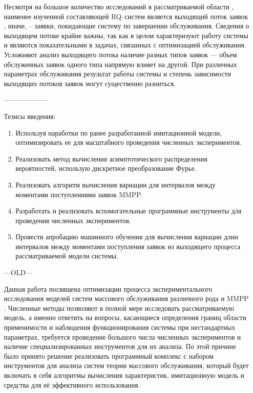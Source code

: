 Несмотря на большое количество исследований в рассматриваемой области \cite{artalejo2010mean,nazarov2017asymptotic,phung2019retrial,kulkarni1983queueing,paul2018retrial}, наименее изученной составляющей RQ--систем является выходящий поток заявок \cite{daley1976queueing}, иначе, -- заявки, покидающие систему по завершении обслуживания. Сведения о выходящем потоке крайне важны, так как в целом характеризуют работу системы и являются показательными в задачах, связанных с оптимизацией обслуживания. Усложняют анализ выходящего потока наличие разных типов заявок --- объем обслуженных заявок одного типа напрямую влияет на другой. При различных параметрах обслуживания результат работы системы и степень зависимости выходящих потоков заявок могут существенно разниться. 

--------------------


Тезисы введения:
\begin{enumerate}
	\item Используя наработки по ранее разработанной имитационной модели, оптимизировать ее для масштабного проведения численных экспериментов.
	\item Реализовать метод вычисления асимптотического распределения вероятностей, использую дискретное преобразование Фурье. 
	\item Реализовать алгоритм вычисления вариации для интервалов между моментами поступлениями заявок MMPP.
	\item Разработать и реализовать вспомогательные программные инструменты для проведения численных экспериментов.
	\item Провести апробацию машинного обучения для вычисления вариации длин интервалов между моментами поступления заявок из выходящего процесса рассматриваемой модели системы.
\end{enumerate}


---OLD---

Данная работа посвящена оптимизации процесса экспериментального исследования моделей систем массового обслуживания различного рода \cite{phung2019retrial} и MMPP \cite{baiocchi1993steady,2019asymptotic,meier1987fitting}. Численные методы позволяют в полной мере исследовать рассматриваемую модель, а именно ответить на вопросы, касающиеся определения границ области применимости и наблюдения функционирования системы при нестандартных параметрах, требуется проведение большого числа численных экспериментов и наличие специализированных инструментов для их анализа. По этой причине было принято решение реализовать программный комплекс с набором инструментов для анализа систем теории массового обслуживания, который будет включать в себя алгоритмы вычисления характеристик, имитационную модель и средства для её эффективного использования.

